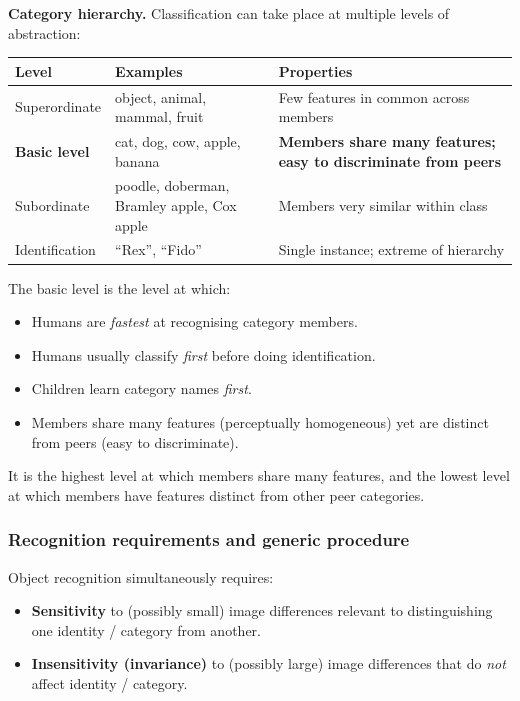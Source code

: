 \separator

\textbf{Category hierarchy.} Classification can take place at multiple levels of abstraction:

\begin{center}
\renewcommand{\arraystretch}{1.3}
\begin{tabular}{@{} l p{4.5cm} p{5cm} @{}}
\toprule
\textbf{Level} & \textbf{Examples} & \textbf{Properties} \\
\midrule
Superordinate & object, animal, mammal, fruit & Few features in common across members \\
\textbf{Basic level} & cat, dog, cow, apple, banana & \textbf{Members share many features; easy to discriminate from peers} \\
Subordinate & poodle, doberman, Bramley apple, Cox apple & Members very similar within class \\
Identification & ``Rex'', ``Fido'' & Single instance; extreme of hierarchy \\
\bottomrule
\end{tabular}
\end{center}

\begin{tipbox}
The basic level is the level at which:
\begin{itemize}
  \item Humans are \emph{fastest} at recognising category members.
  \item Humans usually classify \emph{first} before doing identification.
  \item Children learn category names \emph{first}.
  \item Members share many features (perceptually homogeneous) yet are distinct from peers (easy to discriminate).
\end{itemize}
It is the highest level at which members share many features, and the lowest level at which members have features distinct from other peer categories.
\end{tipbox}

\bigseparator

\subsubsection{Recognition requirements and generic procedure}

\begin{defbox}
Object recognition simultaneously requires:
\begin{itemize}
  \item \textbf{Sensitivity} to (possibly small) image differences relevant to distinguishing one identity / category from another.
  \item \textbf{Insensitivity (invariance)} to (possibly large) image differences that do \emph{not} affect identity / category.
\end{itemize}
\end{defbox}

